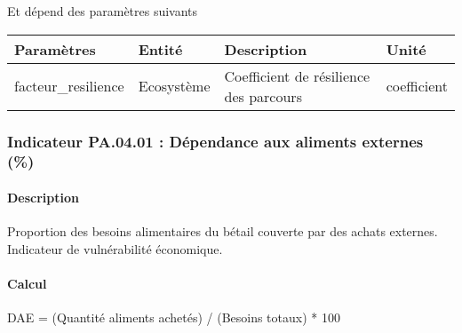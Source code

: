 \documentclass[
]{article}
\newenvironment{Shaded}{\begin{snugshade}}{\end{snugshade}}
\newcommand{\NormalTok}[1]{#1}
\begin{document}
Et dépend des paramètres suivants

\begin{longtable}[]{@{}
  >{\raggedright\arraybackslash}p{}
  >{\raggedright\arraybackslash}p{}
  >{\raggedright\arraybackslash}p{}
  >{\raggedright\arraybackslash}p{}@{}}
\toprule\noalign{}
\begin{minipage}[b]{\linewidth}\raggedright
\textbf{Paramètres}
\end{minipage} & \begin{minipage}[b]{\linewidth}\raggedright
\textbf{Entité}
\end{minipage} & \begin{minipage}[b]{\linewidth}\raggedright
\textbf{Description}
\end{minipage} & \begin{minipage}[b]{\linewidth}\raggedright
\textbf{Unité}
\end{minipage} \\
\midrule\noalign{}
\endhead
\bottomrule\noalign{}
\endlastfoot
facteur\_resilience & Ecosystème & Coefficient de résilience des
parcours & coefficient \\
\end{longtable}

\subsubsection{Indicateur PA.04.01 : Dépendance aux aliments externes
(\%)}\label{indicateur-pa.04.01-duxe9pendance-aux-aliments-externes}

\paragraph{Description}\label{description-3}

Proportion des besoins alimentaires du bétail couverte par des achats
externes. Indicateur de vulnérabilité économique.

\paragraph{Calcul}\label{calcul-3}

\begin{Shaded}
\begin{Highlighting}[]
\NormalTok{DAE = (Quantité aliments achetés) / (Besoins totaux) * 100}
\end{Highlighting}
\end{Shaded}
\end{document}
